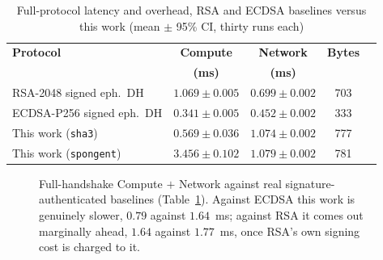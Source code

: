 \documentclass[journal]{IEEEtran}
\begin{document}
\begin{table}[H]
\centering
\caption{Full-protocol latency and overhead, RSA and ECDSA baselines versus
this work (mean $\pm$ 95\% CI, thirty runs each)}
\label{tab:baseline}
\scriptsize
\setlength{\tabcolsep}{1.7pt}
\begin{tabular}{@{}p{2.45cm}cccc@{}}
\toprule
\textbf{Protocol} & \textbf{Compute} &
\textbf{Network} & \textbf{Bytes} \\
 & \textbf{(ms)} & \textbf{(ms)} & \\
\midrule
RSA-2048 signed eph.\ DH   & $1.069{\pm}0.005$ & $0.699{\pm}0.002$ & 703 \\
ECDSA-P256 signed eph.\ DH & $0.341{\pm}0.005$ & $0.452{\pm}0.002$ & 333 \\
\midrule
This work (\texttt{sha3})     & $0.569{\pm}0.036$ & $1.074{\pm}0.002$ & 777 \\
This work (\texttt{spongent}) & $3.456{\pm}0.102$ & $1.079{\pm}0.002$ & 781 \\
\bottomrule
\end{tabular}
\end{table}

\begin{figure}[H]
\centering
{}
\caption{Full-handshake Compute $+$ Network against real signature-authenticated
baselines (Table~\ref{tab:baseline}). Against ECDSA this work is genuinely
slower, $0.79$ against $1.64$~ms; against RSA it comes out marginally ahead,
$1.64$ against $1.77$~ms, once RSA's own signing cost is charged to it.}
\label{fig:base}
\end{figure}
\end{document}
